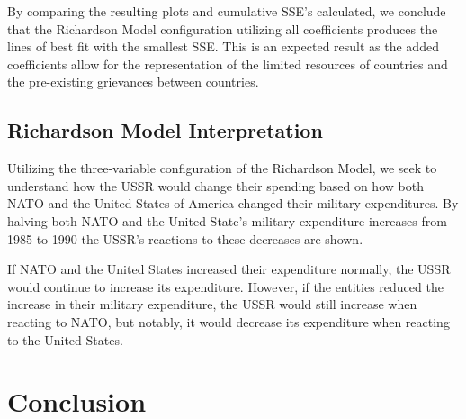 \documentclass[12pt, centerh1]{article}
\begin{document}
By comparing the resulting plots and cumulative SSE's calculated, we conclude that the Richardson Model configuration utilizing all coefficients produces the lines of best fit with the smallest SSE. This is an expected result as the added coefficients allow for the representation of the limited resources of countries and the pre-existing grievances between countries. 

\subsection{Richardson Model Interpretation}

Utilizing the three-variable configuration of the Richardson Model, we seek to understand how the USSR would change their spending based on how both NATO and the United States of America changed their military expenditures. By halving both NATO and the United State's military expenditure increases from 1985 to 1990 the USSR's reactions to these decreases are shown. 

\begin{table}[htb!]
\caption{Percentage Change of USSR Military Expenditure from 1985 to 1990}
\label{results}
\end{table}
If NATO and the United States increased their expenditure normally, the USSR would continue to increase its expenditure. However, if the entities reduced the increase in their military expenditure, the USSR would still increase when reacting to NATO, but notably, it would decrease its expenditure when reacting to the United States.



\section{Conclusion}
\end{document}
